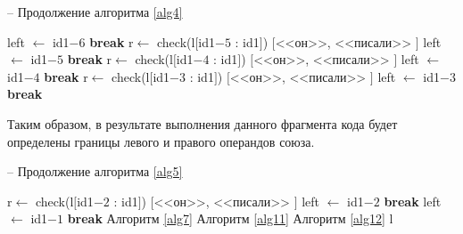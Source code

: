 \documentclass[main]{subfiles}
\begin{document}
\begin{algorithm}
	\caption{-- Продолжение алгоритма \ref{alg4}}\label{alg5}
	\begin{algorithmic}[1]
		\State left $\gets$ id1$-6$ 
		\State \textbf{break}
		\EndIf
		\EndIf
		\EndFor
		\EndIf
		\State r$\gets$ check(l$[$id1$-5$ : id1$]$)
		\State \Return $[$<<он>>, <<писали>> $]$
		\State left $\gets$ id1$-5$ 
		\State \textbf{break}
		\EndIf
		\EndIf
		\EndFor
		\EndIf
		\State r$\gets$ check(l$[$id1$-4$ : id1$]$)
		\State \Return $[$<<он>>, <<писали>> $]$
		\State left $\gets$ id1$-4$ 
		\State \textbf{break}
		\EndIf
		\EndIf
		\EndFor
		\EndIf
		\State r$\gets$ check(l$[$id1$-3$ : id1$]$)
\State \Return $[$<<он>>, <<писали>> $]$
\State left $\gets$ id1$-3$ 
\State \textbf{break}
\EndIf
\EndIf
\EndFor
		\EndIf
	\end{algorithmic}
\end{algorithm}
Таким образом, в результате выполнения данного фрагмента кода будет определены границы левого и правого операндов союза.
\begin{algorithm}
	\caption{-- Продолжение алгоритма \ref{alg5}}\label{alg6}
	\begin{algorithmic}[1]
		\State r$\gets$ check(l$[$id1$-2$ : id1$]$)
		\State \Return $[$<<он>>, <<писали>> $]$
		\State left $\gets$ id1$-2$ 
		\State \textbf{break}
		\EndIf
		\EndIf
		\EndFor
		\EndIf
		\State left $\gets$ id1$-1$
		\State \textbf{break}
		\EndIf
		\EndFor
		\EndIf
		\EndIf
		\State Алгоритм \ref{alg7}
		\State Алгоритм \ref{alg11}
		\State Алгоритм \ref{alg12}
		\State \Return l
		\EndFunction
	\end{algorithmic}
\end{algorithm}
\end{document}
